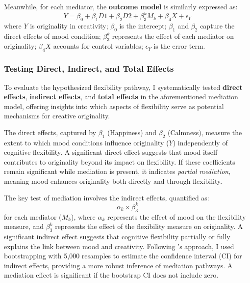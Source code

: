 \documentclass[../MA_Thesis.tex]{subfiles}
\begin{document}
Meanwhile, for each mediator, the \textbf{outcome model} is similarly expressed as:
\begin{equation*}
    Y = \beta_0 + \beta_1 D1 + \beta_2 D2 + \beta_3^k M_k + \beta_4 X + \epsilon_Y
\end{equation*}
where \( Y \) is originality in creativity; \( \beta_0 \) is the intercept; \( \beta_1 \) and \( \beta_2 \) capture the direct effects of mood condition; \( \beta_3^k \) represents the effect of each mediator on originality; \( \beta_4 X \) accounts for control variables; \( \epsilon_Y \) is the error term.

\subsubsection*{Testing Direct, Indirect, and Total Effects}
To evaluate the hypothesized flexibility pathway, I systematically tested \textbf{direct effects}, \textbf{indirect effects}, and \textbf{total effects} in the aforementioned mediation model, offering insights into which aspects of flexibility serve as potential mechanisms for creative originality.

The direct effects, captured by \( \beta_1 \) (Happiness) and \( \beta_2 \) (Calmness), measure the extent to which mood conditions influence originality (\(Y\)) independently of cognitive flexibility. A significant direct effect suggests that mood itself contributes to originality beyond its impact on flexibility. If these coefficients remain significant while mediation is present, it indicates \textit{partial mediation}, meaning mood enhances originality both directly and through flexibility.

The key test of mediation involves the indirect effects, quantified as:
\begin{equation*}
    \alpha_k \times \beta_3^k
\end{equation*}
for each mediator (\(M_k\)), where \( \alpha_k \) represents the effect of mood on the flexibility measure, and \( \beta_3^k \) represents the effect of the flexibility measure on originality. A significant indirect effect suggests that cognitive flexibility partially or fully explains the link between mood and creativity. Following \textcite{preacher_asymptotic_2008}'s approach, I used bootstrapping with 5,000 resamples to estimate the confidence interval (CI) for indirect effects, providing a more robust inference of mediation pathways. A mediation effect is significant if the bootstrap CI does not include zero.
\end{document}
